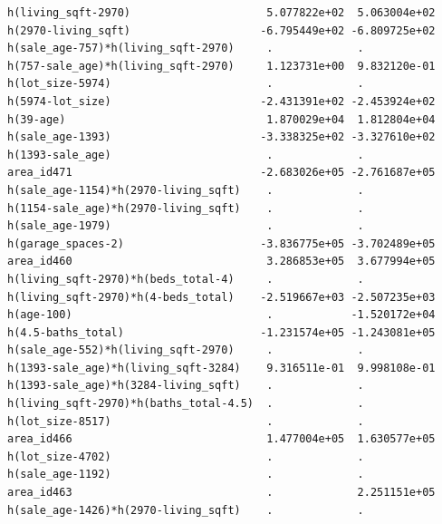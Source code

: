\documentclass[
]{article}
\begin{document}
\begin{verbatim}
h(living_sqft-2970)                     5.077822e+02  5.063004e+02
h(2970-living_sqft)                    -6.795449e+02 -6.809725e+02
h(sale_age-757)*h(living_sqft-2970)     .             .           
h(757-sale_age)*h(living_sqft-2970)     1.123731e+00  9.832120e-01
h(lot_size-5974)                        .             .           
h(5974-lot_size)                       -2.431391e+02 -2.453924e+02
h(39-age)                               1.870029e+04  1.812804e+04
h(sale_age-1393)                       -3.338325e+02 -3.327610e+02
h(1393-sale_age)                        .             .           
area_id471                             -2.683026e+05 -2.761687e+05
h(sale_age-1154)*h(2970-living_sqft)    .             .           
h(1154-sale_age)*h(2970-living_sqft)    .             .           
h(sale_age-1979)                        .             .           
h(garage_spaces-2)                     -3.836775e+05 -3.702489e+05
area_id460                              3.286853e+05  3.677994e+05
h(living_sqft-2970)*h(beds_total-4)     .             .           
h(living_sqft-2970)*h(4-beds_total)    -2.519667e+03 -2.507235e+03
h(age-100)                              .            -1.520172e+04
h(4.5-baths_total)                     -1.231574e+05 -1.243081e+05
h(sale_age-552)*h(living_sqft-2970)     .             .           
h(1393-sale_age)*h(living_sqft-3284)    9.316511e-01  9.998108e-01
h(1393-sale_age)*h(3284-living_sqft)    .             .           
h(living_sqft-2970)*h(baths_total-4.5)  .             .           
h(lot_size-8517)                        .             .           
area_id466                              1.477004e+05  1.630577e+05
h(lot_size-4702)                        .             .           
h(sale_age-1192)                        .             .           
area_id463                              .             2.251151e+05
h(sale_age-1426)*h(2970-living_sqft)    .             .           
                                                                  

\end{verbatim}
\end{document}
